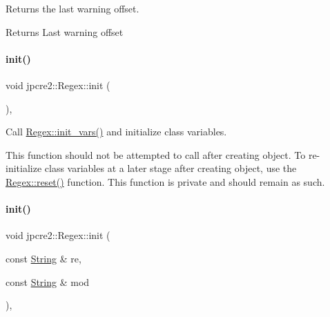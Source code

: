 Returns the last warning offset. 

\begin{DoxyReturn}{Returns}
Last warning offset 
\end{DoxyReturn}
\hypertarget{classjpcre2_1_1Regex_a6df564d3dec70bbeec65de125c7d4de2_a6df564d3dec70bbeec65de125c7d4de2}{}\label{classjpcre2_1_1Regex_a6df564d3dec70bbeec65de125c7d4de2_a6df564d3dec70bbeec65de125c7d4de2} 
\paragraph{\texorpdfstring{init()}{init()}\hspace{0.1cm}{\footnotesize\ttfamily [1/3]}}
{\footnotesize\ttfamily void jpcre2\+::\+Regex\+::init (\begin{DoxyParamCaption}{ }\end{DoxyParamCaption})\hspace{0.3cm}{\ttfamily [inline]}, {\ttfamily [private]}}



Call \hyperlink{classjpcre2_1_1Regex_aff1f5cd95b6ac227014e7a5265a50cc0}{Regex\+::init\+\_\+vars()} and initialize class variables. 

This function should not be attempted to call after creating object. To re-\/initialize class variables at a later stage after creating object, use the \hyperlink{classjpcre2_1_1Regex_a91f6afe257e9633cbb79a98649ab8d02_a91f6afe257e9633cbb79a98649ab8d02}{Regex\+::reset()} function. This function is private and should remain as such. \hypertarget{classjpcre2_1_1Regex_aedc5f414e5fa401e1a91614cfab0b033_aedc5f414e5fa401e1a91614cfab0b033}{}\label{classjpcre2_1_1Regex_aedc5f414e5fa401e1a91614cfab0b033_aedc5f414e5fa401e1a91614cfab0b033} 
\paragraph{\texorpdfstring{init()}{init()}\hspace{0.1cm}{\footnotesize\ttfamily [2/3]}}
{\footnotesize\ttfamily void jpcre2\+::\+Regex\+::init (\begin{DoxyParamCaption}\item[{const \hyperlink{namespacejpcre2_a91f03070152fb228bc116c5a737f1d16}{String} \&}]{re,  }\item[{const \hyperlink{namespacejpcre2_a91f03070152fb228bc116c5a737f1d16}{String} \&}]{mod }\end{DoxyParamCaption})\hspace{0.3cm}{\ttfamily [inline]}, {\ttfamily [private]}}



